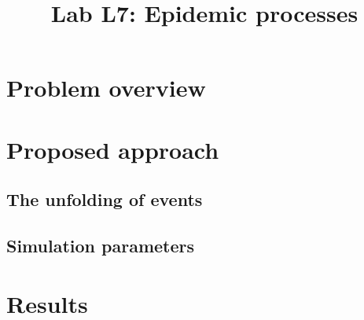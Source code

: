 \documentclass[conference]{IEEEtran}
\begin{document}
\title{
Lab L7: Epidemic processes
}

\author{
}

\maketitle
\begin{abstract}
    
\end{abstract}

\section{Problem overview}

\section{Proposed approach}

    \subsection{The unfolding of events}

    \subsection{Simulation parameters}
   
\section{Results}

    
\end{document}
